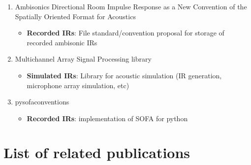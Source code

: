 \begin{itemize}
\begin{enumerate}
  		\item  Ambisonics Directional Room Impulse Response as a New Convention of the Spatially Oriented Format for Acoustics 
		\begin{itemize}
  			\item \textbf{Recorded IRs}: File standard/convention proposal for storage of recorded ambisonic IRs
		\end{itemize}
		
		\item Multichannel Array Signal Processing library 
		\begin{itemize}
  			\item \textbf{Simulated IRs}: Library for acoustic simulation (IR generation, microphone array simulation, etc)
		\end{itemize}

  		\item pysofaconventions 
		\begin{itemize}
  			\item \textbf{Recorded IRs}: implementation of SOFA for python 
		\end{itemize}  		
  		
  		
	\end{enumerate}

\end{itemize}

\section{List of related publications}